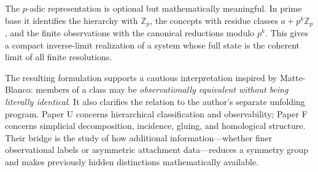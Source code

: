 \documentclass[11pt]{article}
\theoremstyle{definition}
\theoremstyle{remark}
\newcommand{\Zp}{\mathbb Z_p}
\begin{document}
The $p$-adic representation is optional but mathematically meaningful.  In prime base it identifies the hierarchy with $\Zp$, the concepts with residue classes $a+p^k\Zp$, and the finite observations with the canonical reductions modulo $p^k$.  This gives a compact inverse-limit realization of a system whose full state is the coherent limit of all finite resolutions.

The resulting formulation supports a cautious interpretation inspired by Matte-Blanco: members of a class may be \emph{observationally equivalent without being literally identical}.  It also clarifies the relation to the author's separate unfolding program.  Paper U concerns hierarchical classification and observability; Paper F concerns simplicial decomposition, incidence, gluing, and homological structure.  Their bridge is the study of how additional information---whether finer observational labels or asymmetric attachment data---reduces a symmetry group and makes previously hidden distinctions mathematically available.



\end{document}
